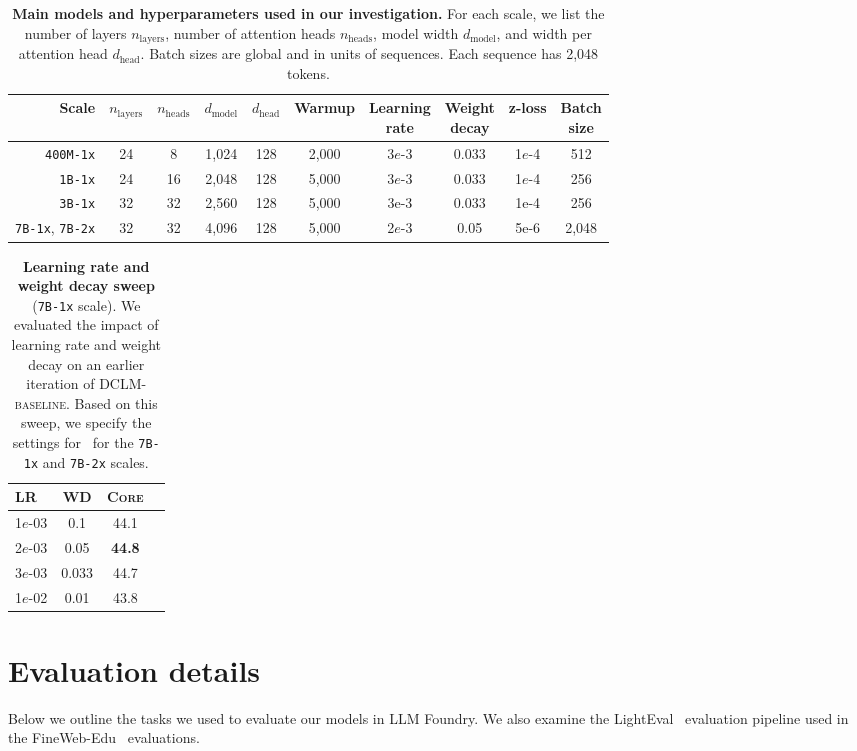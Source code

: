 \documentclass{article}
\newcommand{\hqpool}{\textsc{DCLM-baseline}\xspace}
\newcommand{\xstrack}{\texttt{400M-1x}\xspace}
\newcommand{\strack}{\texttt{1B-1x}\xspace}
\newcommand{\mtrack}{\texttt{3B-1x}\xspace}
\newcommand{\ltrack}{\texttt{7B-1x}\xspace}
\newcommand{\xltrack}{\texttt{7B-2x}\xspace}
\newcommand{\lowvar}{\textsc{Core}\xspace}
\begin{document}
\begin{table}[tp]
    \centering
    \small
    \caption{\textbf{Main models and hyperparameters used in our investigation.} For each scale, we list the number of layers $n_{\text{layers}}$, number of attention heads $n_{\text{heads}}$, model width $d_{\text{model}}$, and width per attention head $d_{\text{head}}$. Batch sizes are global and in units of sequences. Each sequence has 2,048 tokens.
    }
    \begin{tabular}{rccccccccc}
        \toprule
        Scale & $n_{\text{layers}}$ & $n_{\text{heads}}$ & $d_{\text{model}}$ & $d_{\text{head}}$ & Warmup & \makecell{Learning \\rate} & \makecell{Weight \\decay} & z-loss & \makecell{Batch \\size} \\\midrule
        \xstrack & 24 & 8 & 1,024 & 128 & 2,000 & 3$e$-3 & 0.033 & 1$e$-4 & 512 \\
        \strack & 24 & 16 & 2,048 & 128 & 5,000 & 3$e$-3 & 0.033 & 1$e$-4 & 256 \\
        \mtrack & 32 & 32 & 2,560 & 128 & 5,000 & 3e-3 & 0.033 & 1e-4 & 256 \\
        \ltrack, \xltrack & 32 & 32 & 4,096 & 128 & 5,000 & 2$e$-3 &  0.05 & 5e-6 & 2,048 \\\bottomrule
    \end{tabular}
    \label{tab:hparams}
\end{table}

\begin{table}[h]
\centering
\caption{\textbf{Learning rate and weight decay sweep} (\ltrack{} scale). We evaluated the impact of learning rate and weight decay on an earlier iteration of \hqpool. Based on this sweep, we specify the settings for~ for the \ltrack and \xltrack scales.}
\begin{tabular}{lccc}
\toprule
LR & WD & \lowvar \\ 
\midrule
1$e$-03 & 0.1 & 44.1 \\ 
2$e$-03 & 0.05 & \textbf{44.8} \\ 
3$e$-03 & 0.033 & 44.7 \\ 
1$e$-02 & 0.01 & 43.8 \\ 
\bottomrule
\end{tabular}
\label{tab:hparams_7b}
\end{table}

\section{Evaluation details}\label{appx:evaluation}
Below we outline the tasks we used to evaluate our models in LLM Foundry. We also examine the LightEval~\citep{lighteval} evaluation pipeline used in the FineWeb-Edu~\citep{lozhkov2024fineweb-edu} evaluations.
\end{document}
